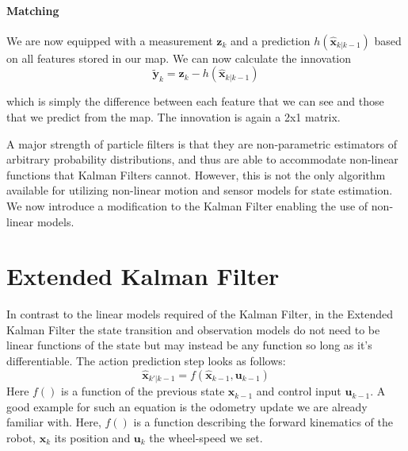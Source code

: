 
\paragraph{Matching}
We are now equipped with a measurement $ \boldsymbol{z}_k$ and a prediction $ h(\hat{\boldsymbol{x}}_{k|k-1})$ based on all features stored in our map. We can now calculate the innovation
\begin{equation}
\tilde{\boldsymbol{y}}_{k}=\boldsymbol{z}_{k}-h(\hat{\boldsymbol{x}}_{k|k-1})
\end{equation}

which is simply the difference between each feature that we can see and those that we predict from the map. The innovation is again a 2x1 matrix.

A major strength of particle filters is that they are non-parametric estimators of arbitrary probability distributions, and thus are able to accommodate non-linear functions that Kalman Filters cannot. However, this is not the only algorithm available for utilizing non-linear motion and sensor models for state estimation. We now introduce a modification to the Kalman Filter enabling the use of non-linear models.


\section{Extended Kalman Filter}\label{sec:EKF}
In contrast to the linear models required of the Kalman Filter, in the Extended Kalman Filter the state transition and observation models do not need to be linear functions of the state but may instead be any function so long as it's differentiable. The action prediction step looks as follows:
\begin{equation}
\hat{\boldsymbol{x}}_{k'|k-1} = f(\hat{\boldsymbol{x}}_{k-1}, \boldsymbol{u}_{k-1})
\end{equation}
Here $ f()$ is a function of the previous state $ \boldsymbol{x}_{k-1}$ and control input $ \boldsymbol{u}_{k-1}$. A good example for such an equation is the odometry update we are already familiar with. Here, $ f()$ is a function describing the forward kinematics of the robot, $ \boldsymbol{x}_k$ its position and $ \boldsymbol{u}_k$ the wheel-speed we set.

